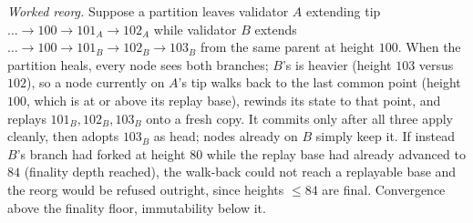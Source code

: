 \emph{Worked reorg.} Suppose a partition leaves validator $A$ extending tip
$\dots{\to}100{\to}101_A{\to}102_A$ while validator $B$ extends
$\dots{\to}100{\to}101_B{\to}102_B{\to}103_B$ from the same parent at height $100$. When the
partition heals, every node sees both branches; $B$'s is heavier (height $103$ versus $102$), so a
node currently on $A$'s tip walks back to the last common point (height $100$, which is at or above
its replay base), rewinds its state to that point, and replays $101_B,102_B,103_B$ onto a fresh copy.
It commits only after all three apply cleanly, then adopts $103_B$ as head; nodes already on $B$
simply keep it. If instead $B$'s branch had forked at height $80$ while the replay base had already
advanced to $84$ (finality depth reached), the walk-back could not reach a replayable base and the
reorg would be refused outright, since heights $\le 84$ are final. Convergence above the finality
floor, immutability below it.
